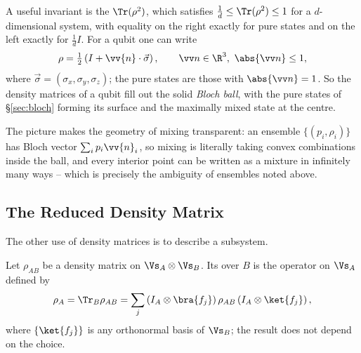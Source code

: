 A useful invariant is the  $\Tr(\rho^2)$, which satisfies $\tfrac1d\leq\Tr(\rho^2)\leq1$ for a $d$-dimensional system, with equality on the right exactly for pure states and on the left exactly for $\tfrac1dI$. For a qubit one can write
$$\rho = \tfrac12\left(I + \vv{n}\cdot\vec\sigma\right), \qquad \vv n\in\R^3,\ \abs{\vv n}\leq1,$$
where $\vec\sigma = (\sigma_x,\sigma_y,\sigma_z)$; the pure states are those with $\abs{\vv n}=1$. So the density matrices of a qubit fill out the solid \emph{Bloch ball}, with the pure states of \S\ref{sec:bloch} forming its surface and the maximally mixed state at the centre.

\begin{center}
\end{center}

The picture makes the geometry of mixing transparent: an ensemble $\{(p_i,\rho_i)\}$ has Bloch vector $\sum_ip_i\vv{n}_i$, so mixing is literally taking convex combinations inside the ball, and every interior point can be written as a mixture in infinitely many ways -- which is precisely the ambiguity of ensembles noted above.

\subsection{The Reduced Density Matrix}\label{sec:reduced}

The other use of density matrices is to describe a subsystem.

\begin{definition}
	Let $\rho_{AB}$ be a density matrix on $\Vs_A\otimes\Vs_B$. Its  over $B$ is the operator on $\Vs_A$ defined by
	$$\rho_A = \Tr_B\rho_{AB} = \sum_j\left(I_A\otimes\bra{f_j}\right)\rho_{AB}\left(I_A\otimes\ket{f_j}\right),$$
	where $\{\ket{f_j}\}$ is any orthonormal basis of $\Vs_B$; the result does not depend on the choice.
\end{definition}

